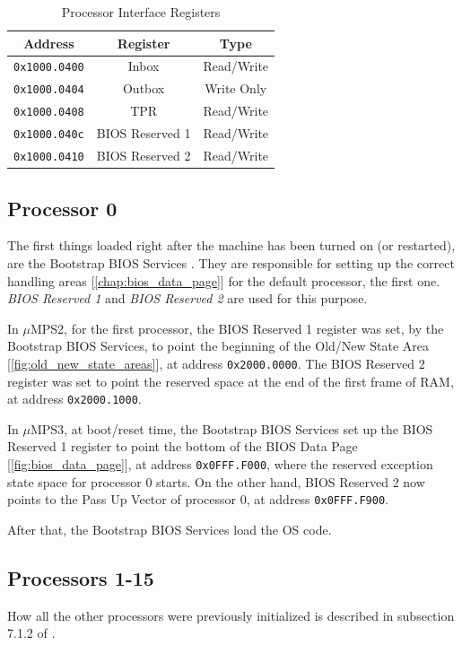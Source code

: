 \documentclass[12pt,a4paper,openright,twoside]{report}
\begin{document}
\begin{table}[h]
	\centering
	\renewcommand{\arraystretch}{0.85}
	\begin{tabular}{|c|c|c|}
		\hline
		Address              & Register        & Type       \\ \hline\hline
		\texttt{0x1000.0400} & Inbox           & Read/Write \\ \hline
		\texttt{0x1000.0404} & Outbox          & Write Only \\ \hline
		\texttt{0x1000.0408} & TPR             & Read/Write \\ \hline
		\texttt{0x1000.040c} & BIOS Reserved 1 & Read/Write \\ \hline
		\texttt{0x1000.0410} & BIOS Reserved 2 & Read/Write \\ \hline
	\end{tabular}
	\caption{Processor Interface Registers}
	\label{tab:processor_interface_registers}
\end{table}

\subsection{Processor 0}
The first things loaded right after the machine has been turned on (or restarted), are the Bootstrap BIOS Services \cite{pops}.
They are responsible for setting up the correct handling areas [\autoref{chap:bios_data_page}] for the default processor, the first one.
\textit{BIOS Reserved 1} and \textit{BIOS Reserved 2} are used for this purpose.

In $\mu$MPS2, for the first processor, the BIOS Reserved 1 register was set, by the Bootstrap BIOS Services, to point the beginning of the Old/New State Area [\autoref{fig:old_new_state_areas}], at address \texttt{0x2000.0000}.
The BIOS Reserved 2 register was set to point the reserved space at the end of the first frame of RAM, at address \texttt{0x2000.1000}.

In $\mu$MPS3, at boot/reset time, the Bootstrap BIOS Services set up the BIOS Reserved 1 register to point the bottom of the BIOS Data Page [\autoref{fig:bios_data_page}], at address \texttt{0x0FFF.F000}, where the reserved exception state space for processor 0 starts.
On the other hand, BIOS Reserved 2 now points to the Pass Up Vector of processor 0, at address \texttt{0x0FFF.F900}.

After that, the Bootstrap BIOS Services load the OS code.

\subsection{Processors 1-15}
How all the other processors were previously initialized is described in subsection 7.1.2 of \cite{old_pops}.
\end{document}

